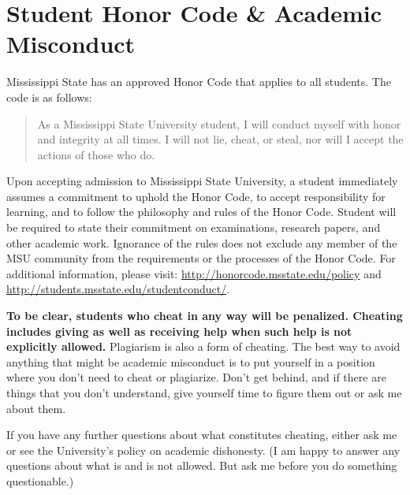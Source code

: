\section{Student Honor Code \& Academic Misconduct}

Mississippi State has an approved Honor Code that applies to all students. The code is as follows: 
\begin{quote}
\vspace{-2mm}
As a Mississippi State University student, I will conduct myself with honor and integrity at all times. I will not lie, cheat, or steal, nor will I accept the actions of those who do.
\vspace{-2mm}
\end{quote}
Upon accepting admission to Mississippi State University, a student immediately assumes a commitment to uphold the Honor Code, to accept responsibility for learning, and to follow the philosophy and rules of the Honor Code. Student will be required to state their commitment on examinations, research papers, and other academic work. Ignorance of the rules does not exclude any member of the MSU community from the requirements or the processes of the Honor Code. For additional information, please visit: \url{http://honorcode.msstate.edu/policy} and \url{http://students.msstate.edu/studentconduct/}.

\textbf{To be clear, students who cheat in any way will be penalized. Cheating includes giving as well as receiving help when such help is not explicitly allowed.} Plagiarism is also a form of cheating. The best way to avoid anything that might be academic misconduct is to put yourself in a position where you don't need to cheat or plagiarize. Don't get behind, and if there are things that you don't understand, give yourself time to figure them out or ask me about them.

If you have any further questions about what constitutes cheating, either ask me or see the University’s policy on academic dishonesty. (I am happy to answer any questions about what is and is not allowed. But ask me before you do something questionable.)


